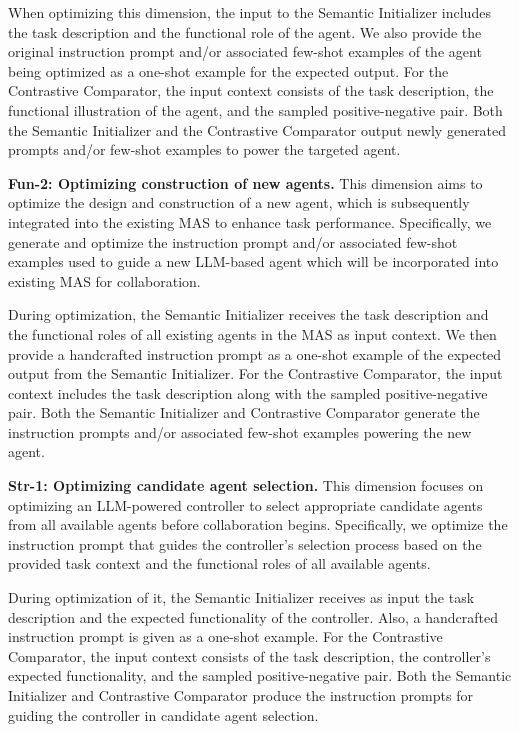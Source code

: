 When optimizing this dimension, the input to the Semantic Initializer includes the task description and the functional role of the agent. We also provide the original instruction prompt and/or associated few-shot examples of the agent being optimized as a one-shot example for the expected output. For the Contrastive Comparator, the input context consists of the task description, the functional illustration of the agent, and the sampled positive-negative pair. Both the Semantic Initializer and the Contrastive Comparator output newly generated prompts and/or few-shot examples to power the targeted agent.


\noindent \textbf{Fun-2: Optimizing construction of new agents.} This dimension aims to optimize the design and construction of a new agent, which is subsequently integrated into the existing MAS to enhance task performance. Specifically, we generate and optimize the instruction prompt and/or associated few-shot examples used to guide a new LLM-based agent which will be incorporated into existing MAS for collaboration. 

During optimization, the Semantic Initializer receives the task description and the functional roles of all existing agents in the MAS as input context. We then provide a handcrafted instruction prompt as a one-shot example of the expected output from the Semantic Initializer. For the Contrastive Comparator, the input context includes the task description along with the sampled positive-negative pair. Both the Semantic Initializer and Contrastive Comparator generate the instruction prompts and/or associated few-shot examples powering the new agent.


\noindent \textbf{Str-1: Optimizing candidate agent selection.} This dimension focuses on optimizing an LLM-powered controller to select appropriate candidate agents from all available agents before collaboration begins. Specifically, we optimize the instruction prompt that guides the controller's selection process based on the provided task context and the functional roles of all available agents. 

During optimization of it, the Semantic Initializer receives as input the task description and the expected functionality of the controller. Also, a handcrafted instruction prompt is given as a one-shot example. For the Contrastive Comparator, the input context consists of the task description, the controller's expected functionality, and the sampled positive-negative pair. Both the Semantic Initializer and Contrastive Comparator produce the instruction prompts for guiding the controller in candidate agent selection. 

